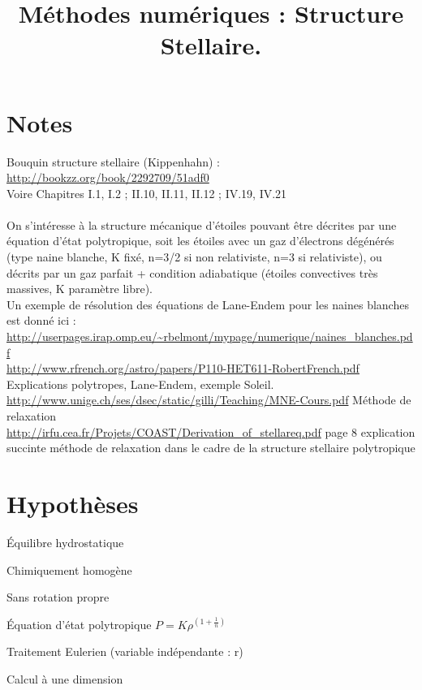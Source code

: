 \documentclass[a4paper,10pt]{article}
\begin{document}
\title{Méthodes numériques : Structure Stellaire.}
\maketitle
\tableofcontents

\newpage

\section*{Notes}
Bouquin structure stellaire (Kippenhahn) :\\
\url{http://bookzz.org/book/2292709/51adf0}\\
Voire Chapitres I.1, I.2 ; II.10, II.11, II.12 ; IV.19, IV.21\\
\\
On s'intéresse à la structure mécanique d'étoiles pouvant être décrites par une équation d'état polytropique, soit les étoiles avec un gaz d'électrons dégénérés (type naine blanche, K fixé, n=3/2 si non relativiste, n=3 si relativiste), ou décrits par un gaz parfait + condition adiabatique (étoiles convectives très massives, K paramètre libre).\\
Un exemple de résolution des équations de Lane-Endem pour les naines blanches est donné ici : \url{http://userpages.irap.omp.eu/~rbelmont/mypage/numerique/naines_blanches.pdf}\\
\url{http://www.rfrench.org/astro/papers/P110-HET611-RobertFrench.pdf} Explications polytropes, Lane-Endem, exemple Soleil.\\
\url{http://www.unige.ch/ses/dsec/static/gilli/Teaching/MNE-Cours.pdf} Méthode de relaxation \\
\url{http://irfu.cea.fr/Projets/COAST/Derivation_of_stellareq.pdf} page 8 explication succinte méthode de relaxation dans le cadre de la structure stellaire polytropique\\


\section{Hypothèses}
\begin{list}{•}{}
\item Équilibre hydrostatique
\item Chimiquement homogène
\item Sans rotation propre
\item Équation d'état polytropique $ P = K \rho^{(1+\frac{1}{n})} $
\item Traitement Eulerien (variable indépendante : r)
\item Calcul à une dimension
\end{list}
\end{document}
